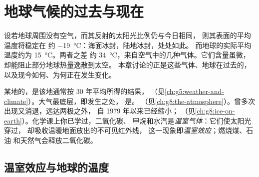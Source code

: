 \chapter{地球气候的过去与现在}\label{ch:g9:climate-past-and-present}

设若地球周围没有空气，而其反射的太阳光比例仍与今日相同，
则其表面的平均温度将稳定在
约 \qty{-19}{\degreeCelsius}：海面冰封，陆地冰封，处处如此。
而地球的实际平均温度约为 \qty{15}{\degreeCelsius}。两者之差
约 \qty{34}{\degreeCelsius}，来自空气中的几种气体。它们含量虽微，
却能阻止部分地球热量逸散到太空。
本章讨论的正是这些气体、地球在过去的，
以及现今如何、为何正在发生变化。

\begin{recall}
某地的，是该地通常按 30 年平均所得的结果，
（见\cref{ch:g5:weather-and-climate}）。大气最底层，即发生之处，
是。
（见\cref{ch:g8:the-atmosphere}）。曾多次出现又消退，远达两极之外，
自 1979 年以来已经缩小；
（见\cref{ch:g8:ice-on-earth}）。化学课上你已学过，二氧化碳、
甲烷和水汽是\emph{温室气体}：它们使太阳光穿过，
却吸收温暖地面放出的不可见红外线，
这一现象即\emph{温室效应}；燃烧煤、石油
和天然气会释放二氧化碳。
\end{recall}

\section{温室效应与地球的温度}

